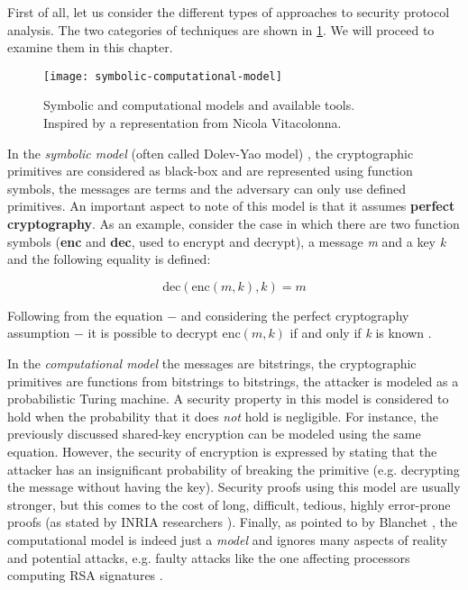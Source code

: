 First of all, let us consider the different types of approaches to security protocol analysis. The two categories of techniques are shown in \cref{fig:symbolic-computational-model}. We will proceed to examine them in this chapter.

\begin{figure}[t]
    \texttt{[image: symbolic-computational-model]}
    \centering
    \caption{Symbolic and computational models and available tools.\\Inspired by a representation from Nicola Vitacolonna.}
    \label{fig:symbolic-computational-model}
\end{figure}

In the \textit{symbolic model} (often called Dolev-Yao model) \cite{Dolev-Yao}, the cryptographic primitives are considered as black-box and are represented using function symbols, the messages are terms and the adversary can only use defined primitives. An important aspect to note of this model is that it assumes \textbf{perfect cryptography}. As an example, consider the case in which there are two function symbols (\textbf{enc} and \textbf{dec}, used to encrypt and decrypt), a message \textit{m} and a key \textit{k} and the following equality is defined:

\begin{equation}
    \mbox{dec}\left(\mbox{enc}\left(m, k\right), k\right) = m
\end{equation}

Following from the equation $-$ and considering the perfect cryptography assumption $-$ it is possible to decrypt $\mbox{enc}\left(m, k\right)$ if and only if \textit{k} is known \cite{SymbolicComputationalBlanchet}.

In the \textit{computational model} the messages are bitstrings, the cryptographic primitives are functions from bitstrings to bitstrings, the attacker is modeled as a probabilistic Turing machine.
A security property in this model is considered to hold when the probability that it does \textit{not} hold is negligible. For instance, the previously discussed shared-key encryption can be modeled using the same equation. However, the security of encryption is expressed by stating that the attacker has an insignificant probability of breaking the primitive (e.g. decrypting the message without having the key). Security proofs using this model are usually stronger, but this comes to the cost of long, difficult, tedious, highly error-prone proofs (as stated by INRIA researchers \cite{ComputationalAnalysisCryptoSystemsINRIA}). Finally, as pointed to by Blanchet \cite{SymbolicComputationalBlanchet}, the computational model is indeed just a \textit{model} and ignores many aspects of reality and potential attacks, e.g. faulty attacks like the one affecting processors computing RSA signatures \cite{RSAFaultAttack}.


